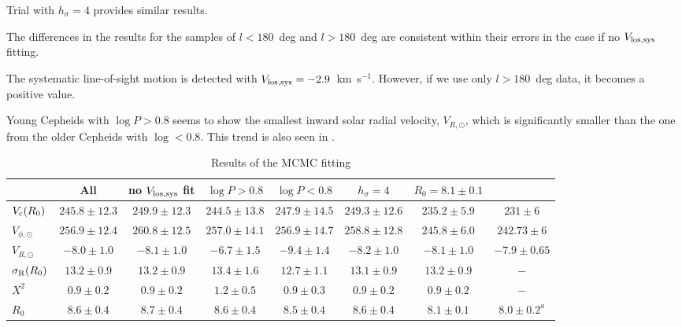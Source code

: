 \documentclass[11pt,a4paper]{article}
\begin{document}
Trial with $h_{\sigma}=4$ provides similar results. 

The differences in the results for the samples of $l<180$~deg and $l>180$~deg are consistent within their errors in the case if no $V_{\rm los,sys}$ fitting. 

The systematic line-of-sight motion is detected with $V_{\rm los,sys}=-2.9$~km~s$^{-1}$. However, if we use only $l>180$~deg data, it becomes a positive value. 

Young Cepheids with $\log P>0.8$ seems to show the smallest inward solar radial velocity, $V_{R,\odot}$, which is significantly smaller than the one from the older Cepheids with $\log<0.8$. This trend is also seen in \citet{vvb17a}.

\begin{landscape}
\begin{table}
 \caption{Results of the MCMC fitting}
 \label{tab:MCMC-res}
 \begin{tabular}{lccccccc }
  \hline
                                        & All                 &  no $V_{\rm los,sys}$ fit & $\log P>0.8$ & $\log P<0.8$ & $h_{\sigma}=4$ & $R_0=8.1\pm0.1$ &  \citet{vvb17a} \\
 \hline
 $V_{\rm c}(R_0)$            & $245.8\pm  12.3$ & $249.9\pm  12.3$ & $244.5\pm  13.8$ & $247.9\pm  14.5$ & $249.3\pm  12.6$
  & $235.2\pm   5.9$ & $231\pm6$ \\
 
 $V_{\phi,\odot}$              & $256.9\pm  12.4$ & $260.8\pm  12.5$ & $257.0\pm  14.1$ & $256.9\pm  14.7$ & $258.8\pm  12.8$ 
  & $245.8\pm   6.0$ & $242.73\pm6$\\

 $V_{R,\odot}$                 & $ -8.0\pm   1.0$    & $ -8.1\pm   1.0$    & $ -6.7\pm   1.5$ & $ -9.4\pm   1.4$ &  $ -8.2\pm   1.0$ 
  & $ -8.1\pm   1.0$ & $-7.9\pm0.65$ \\

 $\sigma_{\rm R}(R_0)$   & $ 13.2\pm   0.9$   & $ 13.2\pm   0.9$   & $ 13.4\pm   1.6$ & $ 12.7\pm   1.1$ & $ 13.1\pm   0.9$ 
  & $ 13.2\pm   0.9$ & $-$ \\

 $X^2$                             & $  0.9\pm   0.2$   & $  0.9\pm   0.2$    &   $  1.2\pm   0.5$ & $  0.9\pm   0.3$ & $  0.9\pm   0.2$ 
   & $  0.9\pm   0.2$ & $-$ \\

 $R_0$                             &  $  8.6\pm   0.4$    & $  8.7\pm   0.4$    & $  8.6\pm   0.4$ & $  8.5\pm   0.4$ & $  8.6\pm   0.4$ 
   &  $  8.1\pm   0.1$ & $8.0\pm0.2^{a}$ \\
  

\end{tabular}
\end{table}
\end{landscape}
\end{document}
